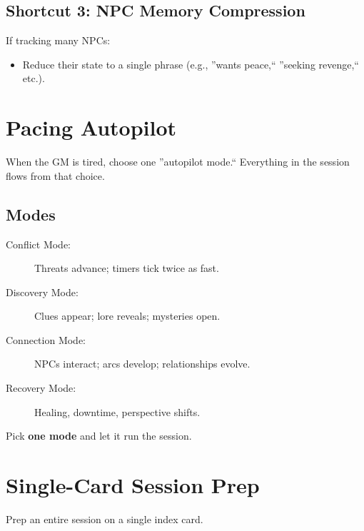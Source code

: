 \documentclass[11pt]{article}
\begin{document}
\subsection{Shortcut 3: NPC Memory Compression}

If tracking many NPCs:
\begin{itemize}
    \item Reduce their state to a single phrase (e.g., ''wants peace,`` ''seeking revenge,`` etc.).
\end{itemize}


\section{Pacing Autopilot}
\label{appendix:pacing-autopilot}

When the GM is tired, choose one ''autopilot mode.``  
Everything in the session flows from that choice.

\subsection{Modes}

\begin{description}
    \item[Conflict Mode:] Threats advance; timers tick twice as fast.
    \item[Discovery Mode:] Clues appear; lore reveals; mysteries open.
    \item[Connection Mode:] NPCs interact; arcs develop; relationships evolve.
    \item[Recovery Mode:] Healing, downtime, perspective shifts.
\end{description}

Pick \textbf{one mode} and let it run the session.


\section{Single-Card Session Prep}
\label{appendix:single-card}

Prep an entire session on a single index card.
\end{document}
